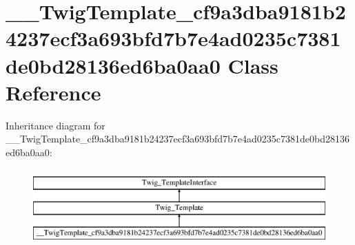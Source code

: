 \hypertarget{class_____twig_template__cf9a3dba9181b24237ecf3a693bfd7b7e4ad0235c7381de0bd28136ed6ba0aa0}{}\section{\+\_\+\+\_\+\+Twig\+Template\+\_\+cf9a3dba9181b24237ecf3a693bfd7b7e4ad0235c7381de0bd28136ed6ba0aa0 Class Reference}
\label{class_____twig_template__cf9a3dba9181b24237ecf3a693bfd7b7e4ad0235c7381de0bd28136ed6ba0aa0}
Inheritance diagram for \+\_\+\+\_\+\+Twig\+Template\+\_\+cf9a3dba9181b24237ecf3a693bfd7b7e4ad0235c7381de0bd28136ed6ba0aa0\+:\begin{figure}[H]
\begin{center}
\leavevmode
\includegraphics[height=3.000000cm]{class_____twig_template__cf9a3dba9181b24237ecf3a693bfd7b7e4ad0235c7381de0bd28136ed6ba0aa0}
\end{center}
\end{figure}
